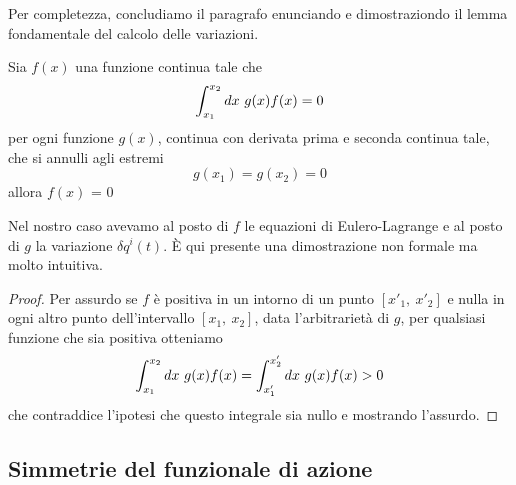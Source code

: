     Per completezza, concludiamo il paragrafo enunciando e dimostraziondo il lemma fondamentale del calcolo delle variazioni.
    \begin{lemma}
        Sia $f(x)$ una funzione continua tale che 
    \begin{equation*}
        \int_{x_1}^{x_2}dx~ g(x) f(x) = 0 
    \end{equation*}
        per ogni funzione $g(x)$, continua con derivata prima e seconda continua tale, che si annulli agli estremi
    \begin{equation*}
        g(x_1) = g(x_2) = 0
    \end{equation*}
        allora $f(x)$ = 0
    \end{lemma}
    Nel nostro caso avevamo al posto di $f$ le equazioni di Eulero-Lagrange e al posto di $g$ la variazione $\delta q^i(t)$. È qui presente una dimostrazione non formale ma molto intuitiva.
    \begin{proof}
        Per assurdo se $f$ è positiva in un intorno di un punto $[x'_1, ~ x'_2]$ e nulla in ogni altro punto dell'intervallo $[x_1, ~ x_2]$, data l'arbitrarietà di $g$, per qualsiasi funzione che sia positiva otteniamo
    \begin{equation*}
        \int_{x_1}^{x_2}dx~ g(x) f(x) = \int_{x'_1}^{x'_2}dx~ g(x) f(x) > 0
    \end{equation*} 
        che contraddice l'ipotesi che questo integrale sia nullo e mostrando l'assurdo.
    \end{proof}

\subsection{Simmetrie del funzionale di azione}
    

